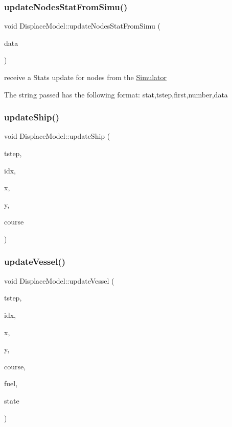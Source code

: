 \mbox{\label{class_displace_model_ad464474e425c9ad36a83bcf36dd76657}} 
\subsubsection{\texorpdfstring{updateNodesStatFromSimu()}{updateNodesStatFromSimu()}}
{\footnotesize\ttfamily void Displace\+Model\+::update\+Nodes\+Stat\+From\+Simu (\begin{DoxyParamCaption}\item[{Q\+String}]{data }\end{DoxyParamCaption})}



receive a Stats update for nodes from the \mbox{\hyperlink{class_simulator}{Simulator}} 

The string passed has the following format\+: stat,tstep,first,number,data \mbox{\label{class_displace_model_a8570224800c327eeea82febef89ca670}} 
\subsubsection{\texorpdfstring{updateShip()}{updateShip()}}
{\footnotesize\ttfamily void Displace\+Model\+::update\+Ship (\begin{DoxyParamCaption}\item[{int}]{tstep,  }\item[{int}]{idx,  }\item[{float}]{x,  }\item[{float}]{y,  }\item[{float}]{course }\end{DoxyParamCaption})}

\mbox{\label{class_displace_model_a673f57c5da772f20f1c24d673e472e5e}} 
\subsubsection{\texorpdfstring{updateVessel()}{updateVessel()}}
{\footnotesize\ttfamily void Displace\+Model\+::update\+Vessel (\begin{DoxyParamCaption}\item[{int}]{tstep,  }\item[{int}]{idx,  }\item[{float}]{x,  }\item[{float}]{y,  }\item[{float}]{course,  }\item[{float}]{fuel,  }\item[{int}]{state }\end{DoxyParamCaption})}

